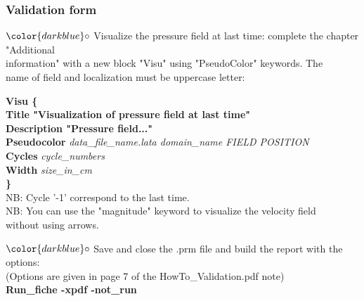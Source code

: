\documentclass[10pt, hyperref={unicode=true,pdfusetitle, bookmarks=true,bookmarksnumbered=false,bookmarksopen=false, breaklinks=false,pdfborder={0 0 1},backref=true,colorlinks=true,linkcolor=darkblue,pageanchor}]{beamer}
\begin{document}
\begin{frame}
\frametitle{Validation form}
\begin{block}{}

\hspace{1cm} $\color{darkblue}\circ$ {\small{Visualize the pressure field at last time: complete the chapter "Additional \\
\hspace{1.3cm} information" with a new block "Visu" using "PseudoColor" keywords. The \\
\hspace{1.3cm} name of field and localization must be uppercase letter: }}

{\footnotesize{
\hspace{1.3cm} \textbf{Visu \{ } \\
\hspace{1.6cm} \textbf{Title "Visualization of pressure field at last time" } \\
\hspace{1.6cm} \textbf{Description "Pressure field..."} \\
\hspace{1.6cm} \textbf{Pseudocolor} \textit{data\_file\_name.lata domain\_name FIELD POSITION} \\
\hspace{1.6cm} \textbf{Cycles}  \textit{cycle\_numbers}\\
\hspace{1.6cm} \textbf{Width} \textit{size\_in\_cm} \\
\hspace{1.3cm} \textbf{\}} \\
}}
{\small{
\hspace{1.3cm} NB: Cycle '-1' correspond to the last time. \\
\hspace{1.3cm} NB: You can use the "magnitude" keyword to visualize the velocity field \\
\hspace{1.3cm} without using arrows.
}}
\vspace{0.2cm}

\hspace{1cm} $\color{darkblue}\circ$ {\small{ Save and close the .prm file and build the report with the options:\\
\hspace{1.3cm} (Options are given in page 7 of the HowTo\_Validation.pdf note) }}\\
\hspace{1.3cm} {\small{\textbf{Run\_fiche -xpdf -not\_run}}}

\end{block}
\end{frame}
\end{document}
